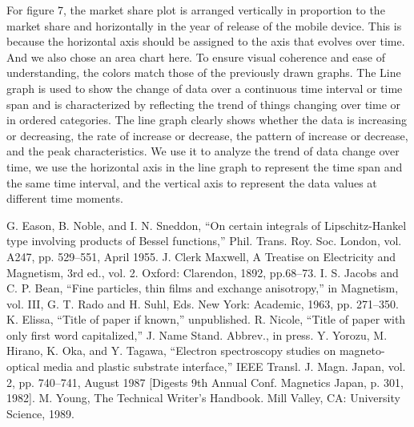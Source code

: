 \documentclass[conference]{IEEEtran}
\begin{document}
For figure 7, the market share plot is arranged vertically in proportion to the market share and horizontally in the year of release of the mobile device. This is because the horizontal axis should be assigned to the axis that evolves over time. And we also chose an area chart here. To ensure visual coherence and ease of understanding, the colors match those of the previously drawn graphs. The Line graph is used to show the change of data over a continuous time interval or time span and is characterized by reflecting the trend of things changing over time or in ordered categories. The line graph clearly shows whether the data is increasing or decreasing, the rate of increase or decrease, the pattern of increase or decrease, and the peak characteristics. We use it to analyze the trend of data change over time, we use the horizontal axis in the line graph to represent the time span and the same time interval, and the vertical axis to represent the data values at different time moments.


\begin{thebibliography}{00}
 G. Eason, B. Noble, and I. N. Sneddon, ``On certain integrals of Lipschitz-Hankel type involving products of Bessel functions,'' Phil. Trans. Roy. Soc. London, vol. A247, pp. 529--551, April 1955.
 J. Clerk Maxwell, A Treatise on Electricity and Magnetism, 3rd ed., vol. 2. Oxford: Clarendon, 1892, pp.68--73.
 I. S. Jacobs and C. P. Bean, ``Fine particles, thin films and exchange anisotropy,'' in Magnetism, vol. III, G. T. Rado and H. Suhl, Eds. New York: Academic, 1963, pp. 271--350.
 K. Elissa, ``Title of paper if known,'' unpublished.
 R. Nicole, ``Title of paper with only first word capitalized,'' J. Name Stand. Abbrev., in press.
 Y. Yorozu, M. Hirano, K. Oka, and Y. Tagawa, ``Electron spectroscopy studies on magneto-optical media and plastic substrate interface,'' IEEE Transl. J. Magn. Japan, vol. 2, pp. 740--741, August 1987 [Digests 9th Annual Conf. Magnetics Japan, p. 301, 1982].
 M. Young, The Technical Writer's Handbook. Mill Valley, CA: University Science, 1989.
\end{thebibliography}
\end{document}
